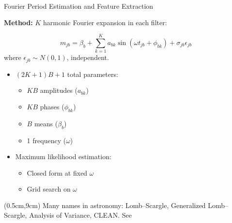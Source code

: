 \documentclass[12pt]{beamer}
\newcommand{\foot}[1]{\begin{textblock*}{12cm}(0.5cm,9cm) %
  {\tiny #1}
      \end{textblock*}}
\begin{document}
\begin{frame}{Fourier Period Estimation and Feature Extraction}

\textbf{Method:} $K$ harmonic Fourier expansion in each filter:

\begin{equation*}
m_{jb} = \beta_b + \sum_{k=1}^K a_{bk}\sin(\omega t_{jb} + \phi_{bk}) + \sigma_{jb}\epsilon_{jb}
\end{equation*}
where $\epsilon_{jb} \sim N(0,1)$, independent.

\begin{itemize}
\item $(2K + 1)B + 1$ total parameters:
  \begin{itemize}
  \item $KB$ amplitudes ($a_{bk}$)
  \item $KB$ phases ($\phi_{bk}$)
  \item $B$ means ($\beta_b$)
  \item 1 frequency ($\omega$)
    \end{itemize}
\item Maximum likelihood estimation:
  \begin{itemize}
\item Closed form at fixed $\omega$
\item Grid search on $\omega$
\end{itemize}
\end{itemize}

\foot{Many names in astronomy: Lomb--Scargle, Generalized Lomb--Scargle, Analysis of Variance, CLEAN. See \cite{mondrik2015multiband,zechmeister2009generalised,lomb1976least,scargle1982studies,schwarzenberg1996fast}}

\end{frame}
\end{document}

